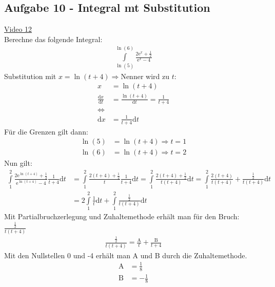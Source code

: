 \subsection{Aufgabe 10 - Integral mt Substitution}
\href{https://youtu.be/lU3LyEOpWQE}{Video 12}\\
Berechne das folgende Integral:\\
\begin{align*}
\int\limits_{\ln(5)}^{\ln(6)} \frac{2\mathrm{e}^x+\frac{1}{2}}{\mathrm{e}^x-4}
\end{align*}
Substitution mit $ x=\ln(t+4) \Rightarrow $Nenner wird zu $ t $:\\
\begin{align*}
x&=\ln(t+4)\\
\frac{\mathrm{d}x}{\mathrm{d}t}&=\frac{\ln(t+4)}{\mathrm{d}t}=\frac{1}{t+4}\\
\Leftrightarrow\\
\mathrm{d}x&=\frac{1}{t+4}\mathrm{d}t
\end{align*}
Für die Grenzen gilt dann:\\
\begin{align*}
\ln(5)&=\ln(t+4)\Rightarrow t=1\\
\ln(6)&=\ln(t+4)\Rightarrow t=2
\end{align*}
Nun gilt:\\
\begin{align*}
\int\limits_{1}^{2} \frac{2\mathrm{e}^{\ln(t+4)}+\frac{1}{2}}{\mathrm{e}^{\ln(t+4)}-4}\frac{1}{t+4}\mathrm{d}t&=\int\limits_{1}^{2}\frac{2(t+4)+\frac{1}{2}}{t} \frac{1}{t+4}\mathrm{d}t=\int\limits_{1}^{2} \frac{2(t+4)+\frac{1}{2}}{t(t+4)}\mathrm{d}t=\int\limits_{1}^{2} \frac{2(t+4)}{t(t+4)}+\frac{\frac{1}{2}}{t(t+4)}\mathrm{d}t\\&=2\int\limits_{1}^{2} \frac{1}{t}\mathrm{d}t+\int\limits_{1}^{2} \frac{\frac{1}{2}}{t(t+4)}\mathrm{d}t
\end{align*}
Mit Partialbruchzerlegung und Zuhaltemethode erhält man für den Bruch: $  \frac{\frac{1}{2}}{t(t+4)} $\\
\begin{align*}
\frac{\frac{1}{2}}{t(t+4)} =\frac{\mathrm{A}}{t}+\frac{\mathrm{B}}{t+4}
\end{align*}
Mit den Nullstellen  0 und -4 erhält man A und B durch die Zuhaltemethode.\\
\begin{align*}
\mathrm{A}&=\frac{1}{8}\\
\mathrm{B}&=-\frac{1}{8}\\
\end{align*}

